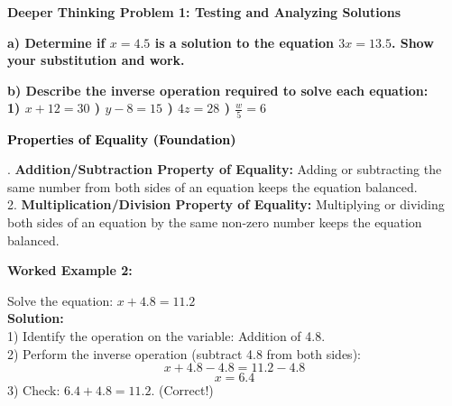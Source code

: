 \documentclass[12pt, letterpaper, fleqn]{article}
\begin{document}
\begin{tcolorbox}[colback=black!5, colframe=black!50, boxrule=1pt, arc=4mm, left=6mm, right=6mm, top=5mm, bottom=5mm]
\textbf{Deeper Thinking Problem 1: Testing and Analyzing Solutions}

\medskip

\noindent
\textbf{a) Determine if $x = 4.5$ is a solution to the equation $3x = 13.5$. Show your substitution and work.}

\vspace{2cm}

\noindent
\textbf{b) Describe the inverse operation required to solve each equation: \\
1) $x + 12 = 30$ \quad {}) $y - 8 = 15$ \quad {}) $4z = 28$ \quad {}) $\frac{w}{5} = 6$}

\vspace{2cm}
\end{tcolorbox}
\newpage

\begin{tcolorbox}[colback=black!10]
    \large\textcolor{black}{\textbf{Properties of Equality (Foundation)}}
\end{tcolorbox}

\vspace{3mm}

. \textbf{Addition/Subtraction Property of Equality:} Adding or subtracting the same number from both sides of an equation keeps the equation balanced. \\
2. \textbf{Multiplication/Division Property of Equality:} Multiplying or dividing both sides of an equation by the same non-zero number keeps the equation balanced.

\vspace{4mm}

\begin{tcolorbox}[colback=white, colframe=black!25, boxrule=0.6pt, arc=4mm, left=6mm, right=6mm, top=5mm, bottom=5mm]
\textbf{Worked Example 2:}

\medskip
\noindent
Solve the equation: $x + 4.8 = 11.2$\\
\textbf{Solution:} \\
1) Identify the operation on the variable: Addition of 4.8. \\
2) Perform the inverse operation (subtract 4.8 from both sides): \\
$$x + 4.8 - 4.8 = 11.2 - 4.8$$
$$x = 6.4$$
3) Check: $6.4 + 4.8 = 11.2$. (Correct!)
\end{tcolorbox}
\end{document}
